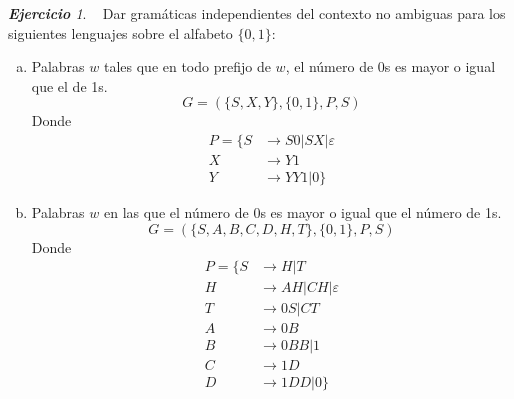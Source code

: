 \documentclass[12pt,spanish]{article}
\theoremstyle{definition}
\theoremstyle{remark}
\newtheorem{exercise}{\textbf{Ejercicio}}%
\begin{document}
\begin{exercise}~ Dar gramáticas independientes del contexto no
  ambiguas para los siguientes lenguajes sobre el alfabeto $\{0,1\}$:

  \begin{enumerate}[a)]
  \item Palabras $w$ tales que en todo prefijo de $w$, el número de 0s
    es mayor o igual que el de 1s.
    \[G=(\{S,X,Y\},\{0,1\},P,S)\]
    Donde \vspace{-5mm}
    \begin{align*}
      P=\{S&\rightarrow S0|SX|\varepsilon \\
      X&\rightarrow Y1 \\
      Y&\rightarrow YY1|0\}
    \end{align*}

  \item Palabras $w$ en las que el número de 0s es mayor o igual que
    el número de 1s.
    \[G=(\{S,A,B,C,D,H,T\},\{0,1\},P,S)\]
    Donde \vspace{-5mm}
    \begin{align*}
      P=\{S&\rightarrow H|T \\
      H&\rightarrow AH|CH|\varepsilon \\
      T&\rightarrow 0S|CT \\
      A&\rightarrow 0B \\
      B&\rightarrow 0BB|1 \\
      C&\rightarrow 1D \\
      D&\rightarrow 1DD|0 \}
    \end{align*}
  \end{enumerate}
  
\end{exercise}
\end{document}
